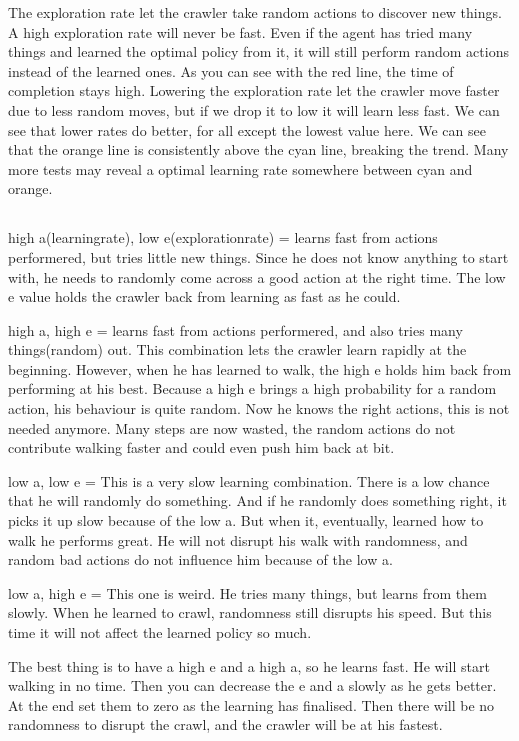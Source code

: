 The exploration rate let the crawler take random actions to discover 
new things. A high exploration rate will never be fast. Even if the 
agent has tried many things and learned the optimal policy from it, 
it will still perform random actions instead of the learned ones. 
As you can see with the red line, the time of completion stays high. 
Lowering the exploration rate let the crawler move faster due to less 
random moves, but if we drop it to low it will learn less fast. We 
can see that lower rates do better, for all except the lowest value here.
We can see that the orange line is consistently above the cyan line, 
breaking the trend. Many more tests may reveal a optimal learning rate 
somewhere between cyan and orange.

\subsection{}

high a(learningrate), low e(explorationrate) = learns fast from actions performered, but tries little new things.
Since he does not know anything to start with, he needs to randomly come across a good action at the right time.
The low e value holds the crawler back from learning as fast as he could.

high a, high e = learns fast from actions performered, and also tries many things(random) out.
This combination lets the crawler learn rapidly at the beginning. However, when he has learned to walk, the high e
holds him back from performing at his best. Because a high e brings a high probability for a random action, his
behaviour is quite random. Now he knows the right actions, this is not needed anymore. Many steps are now wasted, the random
actions do not contribute walking faster and could even push him back at bit.

low a, low e = This is a very slow learning combination. There is a low chance that he will randomly do something.
And if he randomly does something right, it picks it up slow because of the low a. But when it, eventually, learned how to walk
he performs great. He will not disrupt his walk with randomness, and random bad actions do not influence him because of
the low a.

low a, high e = This one is weird. He tries many things, but learns from them slowly. When he learned to crawl, randomness
still disrupts his speed. But this time it will not affect the learned policy so much.

The best thing is to have a high e and a high a, so he learns fast. He will start walking in no time. Then you can decrease
the e and a slowly as he gets better. At the end set them to zero as the learning has finalised. Then there will be no
randomness to disrupt the crawl, and the crawler will be at his fastest.

\subsection{}

\subsection{}